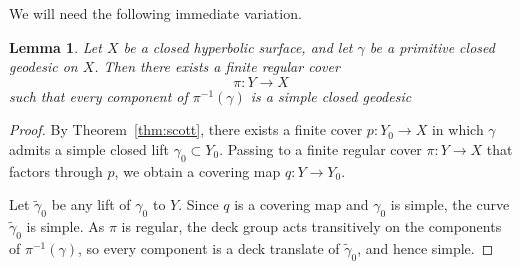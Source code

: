 \documentclass[12pt]{amsart}
\numberwithin{equation}{section}
\numberwithin{figure}{section}
\newtheorem{lemma}[equation]{Lemma}
\theoremstyle{definition}
\theoremstyle{plain}
\newcommand*{\wt}[1]{\widetilde{#1}}
\begin{document}
We will need the following immediate variation.

\begin{lemma}
Let $X$ be a closed hyperbolic surface, and let $\gamma$ be a primitive closed geodesic on $X$.
Then there exists a finite regular cover
\[
\pi:Y\to X
\]
such that \emph{every} component of $\pi^{-1}(\gamma)$ is a simple closed geodesic
\label{lem:scott_regular}
\end{lemma}

\begin{proof}
By Theorem~\ref{thm:scott}, there exists a finite cover $p:Y_0\to X$ in which $\gamma$ admits a simple closed lift $\gamma_0\subset Y_0$. Passing to a finite regular cover $\pi:Y\to X$ that factors through $p$, we obtain a covering map $q:Y\to Y_0$.

Let $\wt{\gamma}_0$ be any lift of $\gamma_0$ to $Y$. Since $q$ is a covering map and $\gamma_0$ is simple, the curve $\wt{\gamma}_0$ is simple. As $\pi$ is regular, the deck group acts transitively on the components of $\pi^{-1}(\gamma)$, so every component is a deck translate of $\wt{\gamma}_0$, and hence simple.
\end{proof}
\end{document}
